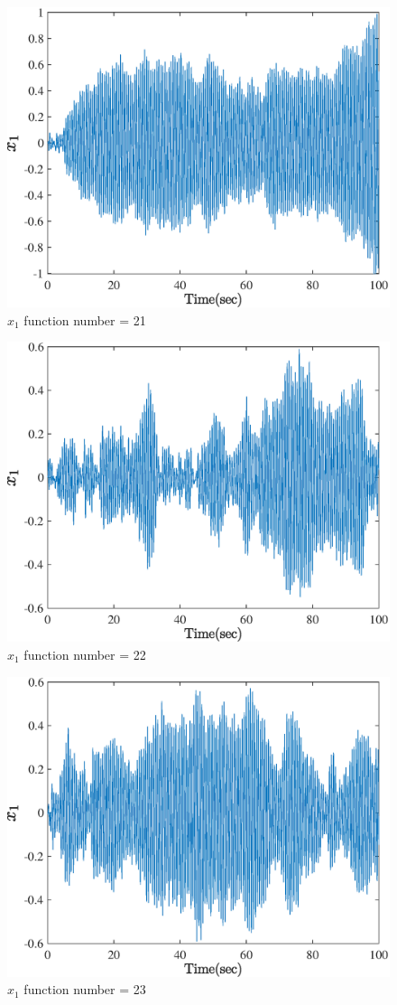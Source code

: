   \begin{figure}[H] 
  	\caption{$x_1$ function number = 21} 
  	\centering 
  	\includegraphics[width=12cm]{../Figure/Q5/part_a/21} 
  \end{figure}
  \begin{figure}[H] 
  	\caption{$x_1$ function number = 22} 
  	\centering 
  	\includegraphics[width=12cm]{../Figure/Q5/part_a/22} 
  \end{figure}
  \begin{figure}[H] 
  	\caption{$x_1$ function number = 23} 
  	\centering 
  	\includegraphics[width=12cm]{../Figure/Q5/part_a/23} 
  \end{figure}
